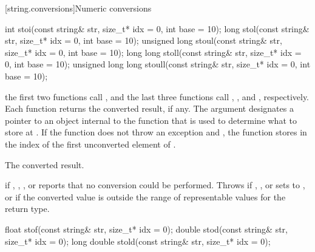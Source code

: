 \begin{itemdescr}
\pnum
\returns
{}
\end{itemdescr}

[string.conversions]{Numeric conversions}

%
%
%
%
%
\begin{itemdecl}
int stoi(const string& str, size_t* idx = 0, int base = 10);
long stol(const string& str, size_t* idx = 0, int base = 10);
unsigned long stoul(const string& str, size_t* idx = 0, int base = 10);
long long stoll(const string& str, size_t* idx = 0, int base = 10);
unsigned long long stoull(const string& str, size_t* idx = 0, int base = 10);
\end{itemdecl}

\begin{itemdescr}
\pnum
\effects the first two functions call ,
and the last three functions call ,
, and , respectively. Each function returns the converted result, if any. The
argument  designates a pointer to an object internal to the function
that is used to determine what to store at . If the function does
not throw an exception and , the function stores in 
the index of the first unconverted element of .

\pnum
\returns The converted result.

\pnum
\throws {} if , ,
, or  reports that no conversion could be
performed. Throws  if , ,
 or  sets  to ,
or if the converted value is outside the range of representable values
for the return type.
\end{itemdescr}

%
%
%
\begin{itemdecl}
float stof(const string& str, size_t* idx = 0);
double stod(const string& str, size_t* idx = 0);
long double stold(const string& str, size_t* idx = 0);
\end{itemdecl}

